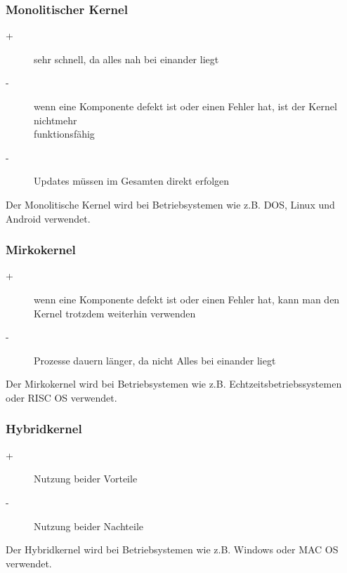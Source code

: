 \documentclass[12pt,a4paper]{article}
\begin{document}
\subsubsection{Monolitischer Kernel}
\begin{description}
    \item[+]{sehr schnell, da alles nah bei einander liegt}
    \item[-]{wenn eine Komponente defekt ist oder einen Fehler hat, ist der Kernel nichtmehr \\ funktionsfähig}
    \item[-]{Updates müssen im Gesamten direkt erfolgen}
\end{description}
Der Monolitische Kernel wird bei Betriebsystemen wie z.B. DOS, Linux und Android verwendet.
\subsubsection{Mirkokernel}
\begin{description}
    \item[+]{wenn eine Komponente defekt ist oder einen Fehler hat, kann man den Kernel trotzdem weiterhin verwenden}
    \item[-]{Prozesse dauern länger, da nicht Alles bei einander liegt}
\end{description}
Der Mirkokernel wird bei Betriebsystemen wie z.B. Echtzeitsbetriebssystemen oder RISC OS verwendet.
\subsubsection{Hybridkernel}
\begin{description}
    \item[+]{Nutzung beider Vorteile}
    \item[-]{Nutzung beider Nachteile}
\end{description}
Der Hybridkernel wird bei Betriebsystemen wie z.B. Windows oder MAC OS verwendet.
\end{document}
